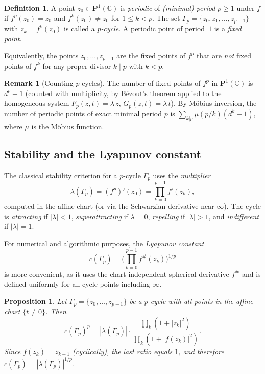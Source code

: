 \documentclass[12pt]{article}
\newtheorem{proposition}[theorem]{Proposition}
\theoremstyle{definition}
\newtheorem{definition}[theorem]{Definition}
\newtheorem{remark}[theorem]{Remark}
\newcommand{\C}{\mathbb{C}}
\newcommand{\Pone}{\mathbf{P}^1(\C)}
\newcommand{\fsh}{f^{\#}}
\begin{document}
\begin{definition}\label{def:pcycle}
A point $z_0\in\Pone$ is \emph{periodic} of \emph{(minimal) period} $p\geq 1$
under $f$ if $f^p(z_0)=z_0$ and $f^k(z_0)\neq z_0$ for $1\leq k<p$.
The set $\Gamma_p = \{z_0, z_1,\ldots,z_{p-1}\}$ with $z_k=f^k(z_0)$ is
called a \emph{$p$-cycle}.  A periodic point of period~$1$ is a \emph{fixed
point}.
\end{definition}

Equivalently, the points $z_0,\ldots,z_{p-1}$ are the fixed points of $f^p$
that are \emph{not} fixed points of $f^k$ for any proper divisor $k\mid p$
with $k<p$.

\begin{remark}[Counting $p$-cycles]
The number of fixed points of $f^p$ in $\Pone$ is $d^p+1$ (counted with
multiplicity, by B\'ezout's theorem applied to the homogeneous system
$F_p(z,t)=\lambda\,z$, $G_p(z,t)=\lambda\,t$).  By M\"obius inversion, the
number of periodic points of exact minimal period $p$ is
$\sum_{k|p}\mu(p/k)(d^k+1)$, where $\mu$ is the M\"obius function.
\end{remark}

\subsection{Stability and the Lyapunov constant}

The classical stability criterion for a $p$-cycle $\Gamma_p$ uses the
\emph{multiplier}
\begin{equation}\label{eq:multiplier}
  \lambda(\Gamma_p) = (f^p)'(z_0) = \prod_{k=0}^{p-1} f'(z_k),
\end{equation}
computed in the affine chart (or via the Schwarzian derivative near $\infty$).
The cycle is \emph{attracting} if $|\lambda|<1$,
\emph{superattracting} if $\lambda=0$,
\emph{repelling} if $|\lambda|>1$, and
\emph{indifferent} if $|\lambda|=1$.

For numerical and algorithmic purposes, the \emph{Lyapunov constant}
\cite{AlvarezAparicio2023}
\begin{equation}\label{eq:lyapunov}
  c(\Gamma_p) = \biggl(\prod_{k=0}^{p-1}\fsh(z_k)\biggr)^{1/p}
\end{equation}
is more convenient, as it uses the chart-independent spherical derivative
$\fsh$ and is defined uniformly for all cycle points including $\infty$.

\begin{proposition}\label{prop:lyapunov_vs_multiplier}
Let $\Gamma_p=\{z_0,\ldots,z_{p-1}\}$ be a $p$-cycle with all points in
the affine chart $\{t\neq 0\}$.  Then
\[
  c(\Gamma_p)^p = |\lambda(\Gamma_p)|\cdot
                   \frac{\prod_k (1+|z_k|^2)}%
                        {\prod_k (1+|f(z_k)|^2)}.
\]
Since $f(z_{k})=z_{k+1}$ (cyclically), the last ratio equals $1$, and
therefore $c(\Gamma_p) = |\lambda(\Gamma_p)|^{1/p}$.
\end{proposition}
\end{document}
